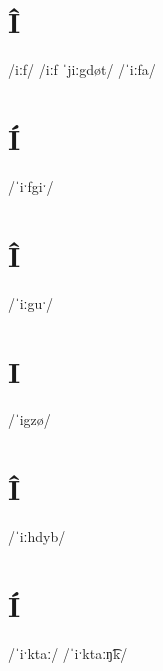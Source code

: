 \documentclass[10pt,a4paper,twoside]{book}
\begin{document}
\section*{Î}

\begin{multicols}{3}
 {/iːf/} {}
 {/iːf ˈjiːgdøt/} {}
 {/ˈiːfa/} {}
\end{multicols}

\section*{Í}

\begin{multicols}{3}
 {/ˈiˑfgiˑ/} {}
\end{multicols}

\section*{Î}

\begin{multicols}{3}
 {/ˈiːguˑ/} {}
\end{multicols}

\section*{I}

\begin{multicols}{3}
 {/ˈigzø/} {}
\end{multicols}

\section*{Î}

\begin{multicols}{3}
 {/ˈiːhdyb/} {}
\end{multicols}

\section*{Í}

\begin{multicols}{3}
 {/ˈiˑktaː/} {}
 {/ˈiˑktaːŋ͡k/} {}
\end{multicols}
\end{document}

